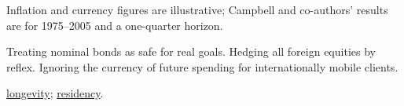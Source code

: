 \begin{qfmethod}
 Inflation and currency figures are illustrative; Campbell and co-authors' results are for 1975--2005 and a one-quarter horizon.

 Treating nominal bonds as safe for real goals. Hedging all foreign equities by reflex. Ignoring the currency of future spending for internationally mobile clients.

 \hyperref[meth:lifetime-exposures]{longevity}; \hyperref[meth:residency-citizenship]{residency}.

\end{qfmethod}
